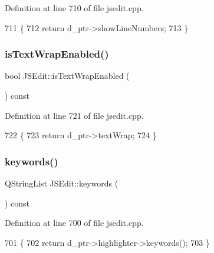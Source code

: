 Definition at line 710 of file jsedit.\+cpp.


\begin{DoxyCode}
711 \{
712     \textcolor{keywordflow}{return} d\_ptr->showLineNumbers;
713 \}
\end{DoxyCode}
\mbox{\label{class_j_s_edit_a7d397d0f91f3829d4897b103a7f238f1}} 
\subsubsection{\texorpdfstring{is\+Text\+Wrap\+Enabled()}{isTextWrapEnabled()}}
{\footnotesize\ttfamily bool J\+S\+Edit\+::is\+Text\+Wrap\+Enabled (\begin{DoxyParamCaption}{ }\end{DoxyParamCaption}) const}



Definition at line 721 of file jsedit.\+cpp.


\begin{DoxyCode}
722 \{
723     \textcolor{keywordflow}{return} d\_ptr->textWrap;
724 \}
\end{DoxyCode}
\mbox{\label{class_j_s_edit_af2a11c0f985403c3cf42143151688500}} 
\subsubsection{\texorpdfstring{keywords()}{keywords()}}
{\footnotesize\ttfamily Q\+String\+List J\+S\+Edit\+::keywords (\begin{DoxyParamCaption}{ }\end{DoxyParamCaption}) const}



Definition at line 700 of file jsedit.\+cpp.


\begin{DoxyCode}
701 \{
702     \textcolor{keywordflow}{return} d\_ptr->highlighter->keywords();
703 \}
\end{DoxyCode}
\mbox{\label{class_j_s_edit_a8bf20e989fa0818d2bc32fefd4110821}} 
